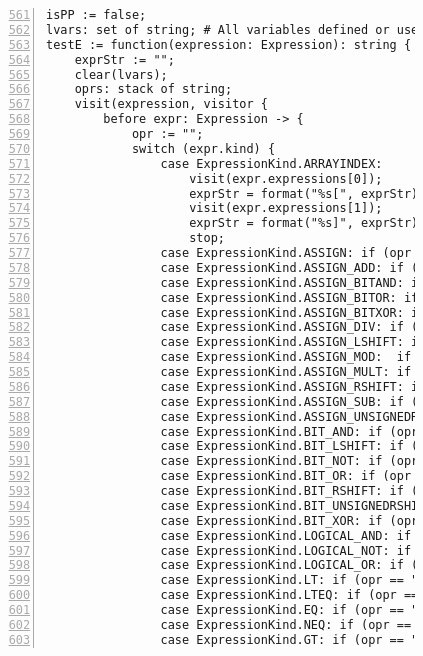 \begin{figure}[ht!]
\begin{lstlisting}[numbers=left, tabsize=4, escapechar=@, caption={API Usage Mining Analysis},label={lst:aun-code},  firstline = 561, firstnumber = 561, lastline = 621]
isPP := false;
lvars: set of string; # All variables defined or used in a node
testE := function(expression: Expression): string {
    exprStr := "";
    clear(lvars);
    oprs: stack of string;
    visit(expression, visitor {
        before expr: Expression -> {
            opr := "";
            switch (expr.kind) {
                case ExpressionKind.ARRAYINDEX:
                    visit(expr.expressions[0]);
                    exprStr = format("%s[", exprStr);
                    visit(expr.expressions[1]);
                    exprStr = format("%s]", exprStr);
                    stop;
                case ExpressionKind.ASSIGN: if (opr == "") opr = "="; 
                case ExpressionKind.ASSIGN_ADD: if (opr == "") opr = "+="; 
                case ExpressionKind.ASSIGN_BITAND: if (opr == "") opr = "&="; 
                case ExpressionKind.ASSIGN_BITOR: if (opr == "") opr = "|="; 
                case ExpressionKind.ASSIGN_BITXOR: if (opr == "") opr = "^="; 
                case ExpressionKind.ASSIGN_DIV: if (opr == "") opr = "/="; 
                case ExpressionKind.ASSIGN_LSHIFT: if (opr == "") opr = "<<="; 
                case ExpressionKind.ASSIGN_MOD:  if (opr == "") opr = "%="; 
                case ExpressionKind.ASSIGN_MULT: if (opr == "") opr = "*="; 
                case ExpressionKind.ASSIGN_RSHIFT: if (opr == "") opr = ">>="; 
                case ExpressionKind.ASSIGN_SUB: if (opr == "") opr = "-="; 
                case ExpressionKind.ASSIGN_UNSIGNEDRSHIFT: if (opr == "") opr = ">>>="; 
                case ExpressionKind.BIT_AND: if (opr == "") opr = "&"; 
                case ExpressionKind.BIT_LSHIFT: if (opr == "") opr = "<<"; 
                case ExpressionKind.BIT_NOT: if (opr == "") opr = "~"; 
                case ExpressionKind.BIT_OR: if (opr == "") opr = "|"; 
                case ExpressionKind.BIT_RSHIFT: if (opr == "") opr = ">>"; 
                case ExpressionKind.BIT_UNSIGNEDRSHIFT: if (opr == "") opr = ">>>"; 
                case ExpressionKind.BIT_XOR: if (opr == "") opr = "^"; 
                case ExpressionKind.LOGICAL_AND: if (opr == "") opr = "&&"; 
                case ExpressionKind.LOGICAL_NOT: if (opr == "") opr = "!";
                case ExpressionKind.LOGICAL_OR: if (opr == "") opr = "||";
                case ExpressionKind.LT: if (opr == "") opr = "<";
                case ExpressionKind.LTEQ: if (opr == "") opr = "<="; 
                case ExpressionKind.EQ: if (opr == "") opr = "==";
                case ExpressionKind.NEQ: if (opr == "") opr = "!=";
                case ExpressionKind.GT: if (opr == "") opr = ">";

\end{lstlisting}
\end{figure}
